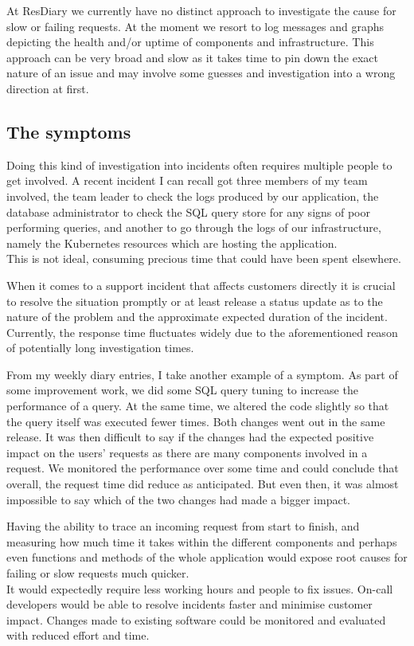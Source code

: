 \documentclass[11pt]{article}
\begin{document}
At ResDiary we currently have no distinct approach to investigate the cause for slow or failing requests. At the moment we resort to log messages and graphs depicting the health and/or uptime of components and infrastructure. This approach can be very broad and slow as it takes time to pin down the exact nature of an issue and may involve some guesses and investigation into a wrong direction at first. 

\subsection{The symptoms}

Doing this kind of investigation into incidents often requires multiple people to get involved. A recent incident I can recall got three members of my team involved, the team leader to check the logs produced by our application, the database administrator to check the SQL query store for any signs of poor performing queries, and another to go through the logs of our infrastructure, namely the Kubernetes resources which are hosting the application.\\
This is not ideal, consuming precious time that could have been spent elsewhere.

When it comes to a support incident that affects customers directly it is crucial to resolve the situation promptly or at least release a status update as to the nature of the problem and the approximate expected duration of the incident. Currently, the response time fluctuates widely due to the aforementioned reason of potentially long investigation times.

From my weekly diary entries, I take another example of a symptom. As part of some improvement work, we did some SQL query tuning to increase the performance of a query. At the same time, we altered the code slightly so that the query itself was executed fewer times. Both changes went out in the same release. It was then difficult to say if the changes had the expected positive impact on the users' requests as there are many components involved in a request. We monitored the performance over some time and could conclude that overall, the request time did reduce as anticipated. But even then, it was almost impossible to say which of the two changes had made a bigger impact.

Having the ability to trace an incoming request from start to finish, and measuring how much time it takes within the different components and perhaps even functions and methods of the whole application would expose root causes for failing or slow requests much quicker.\\
It would expectedly require less working hours and people to fix issues. On-call developers would be able to resolve incidents faster and minimise customer impact. Changes made to existing software could be monitored and evaluated with reduced effort and time.
\end{document}
